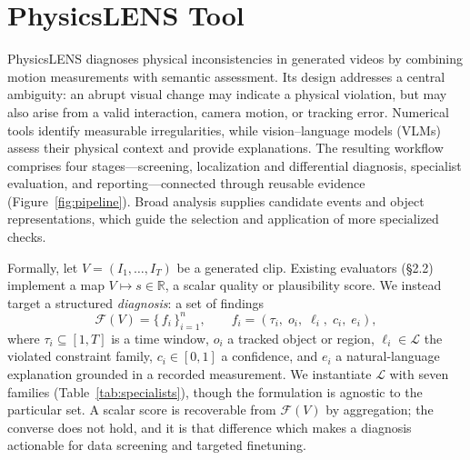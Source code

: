 \section{PhysicsLENS Tool}
PhysicsLENS diagnoses physical inconsistencies in generated videos by combining motion measurements with semantic assessment. Its design addresses a central ambiguity: an abrupt visual change may indicate a physical violation, but may also arise from a valid interaction, camera motion, or tracking error. Numerical tools identify measurable irregularities, while vision--language models (VLMs) assess their physical context and provide explanations. The resulting workflow comprises four stages---screening, localization and differential diagnosis, specialist evaluation, and reporting---connected through reusable evidence (Figure~\ref{fig:pipeline}). Broad analysis supplies candidate events and object representations, which guide the selection and application of more specialized checks.

 
Formally, let $V=(I_1,\dots,I_T)$ be a generated clip. Existing evaluators (\S2.2) implement a map $V \mapsto s \in \mathbb{R}$, a scalar quality or plausibility score. We instead target a structured \emph{diagnosis}: a set of findings
\begin{equation}
\mathcal{F}(V) = \{\, f_i \,\}_{i=1}^{n}, \qquad f_i = (\tau_i,\; o_i,\; \ell_i,\; c_i,\; e_i),
\label{eq:finding}
\end{equation}
where $\tau_i \subseteq [1,T]$ is a time window, $o_i$ a tracked object or region, $\ell_i \in \mathcal{L}$ the violated constraint family, $c_i \in [0,1]$ a confidence, and $e_i$ a natural-language explanation grounded in a recorded measurement. We instantiate $\mathcal{L}$ with seven families (Table~\ref{tab:specialists}), though the formulation is agnostic to the particular set. A scalar score is recoverable from $\mathcal{F}(V)$ by aggregation; the converse does not hold, and it is that difference which makes a diagnosis actionable for data screening and targeted finetuning.


